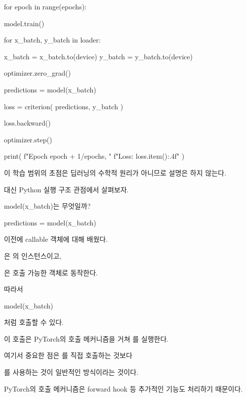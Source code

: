 \begin{dhkcode}
for epoch in range(epochs):

    model.train()

    for x_batch, y_batch in loader:

        x_batch = x_batch.to(device)
        y_batch = y_batch.to(device)

        optimizer.zero_grad()

        predictions = model(x_batch)

        loss = criterion(
            predictions,
            y_batch
        )

        loss.backward()

        optimizer.step()

    print(
        f"Epoch {epoch + 1}/{epochs}, "
        f"Loss: {loss.item():.4f}"
    )
\end{dhkcode}

이 학습 범위의 초점은 딥러닝의 수학적 원리가 아니므로 설명은 하지 않는다.

대신 Python 실행 구조 관점에서 살펴보자.

\begin{dhknote}
\begin{dhksmry}[centered]
model(x_batch)는 무엇일까?
\end{dhksmry}
\end{dhknote}

\begin{dhkcode}
predictions = model(x_batch)
\end{dhkcode}

이전에 callable 객체에 대해 배웠다.

은 의 인스턴스이고,

은 호출 가능한 객체로 동작한다.

따라서

\begin{dhkcode}
model(x_batch)
\end{dhkcode}

처럼 호출할 수 있다.

이 호출은 PyTorch의  호출 메커니즘을 거쳐 를 실행한다.

여기서 중요한 점은 를 직접 호출하는 것보다

를 사용하는 것이 일반적인 방식이라는 것이다.

PyTorch의 호출 메커니즘은 forward hook 등 추가적인 기능도 처리하기 때문이다.

